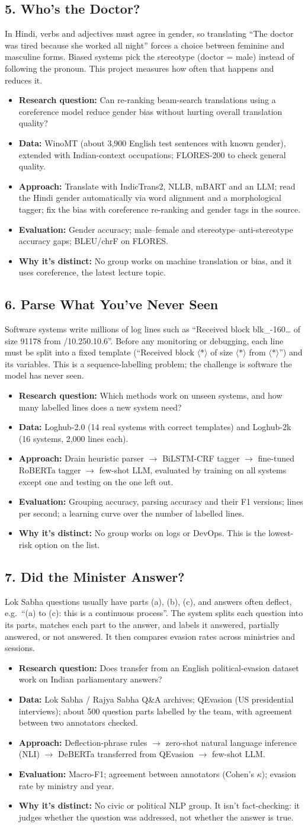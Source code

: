 \documentclass[11pt,a4paper]{article}
\newcommand{\project}[7]{%
  \needspace{14\baselineskip}
  \subsection{#1}
  #2
  \begin{itemize}
    \item \textbf{Research question:} #3
    \item \textbf{Data:} #4
    \item \textbf{Approach:} #5
    \item \textbf{Evaluation:} #6
    \item \textbf{Why it's distinct:} #7
  \end{itemize}}
\begin{document}
\project{5. Who's the Doctor?}
  {In Hindi, verbs and adjectives must agree in gender, so translating ``The doctor was tired because
   she worked all night'' forces a choice between feminine and masculine forms. Biased systems pick
   the stereotype (doctor = male) instead of following the pronoun. This project measures how often
   that happens and reduces it.}
  {Can re-ranking beam-search translations using a coreference model reduce gender bias without
   hurting overall translation quality?}
  {WinoMT (about 3,900 English test sentences with known gender), extended with Indian-context
   occupations; FLORES-200 to check general quality.}
  {Translate with IndicTrans2, NLLB, mBART and an LLM; read the Hindi gender automatically via word
   alignment and a morphological tagger; fix the bias with coreference re-ranking and gender tags
   in the source.}
  {Gender accuracy; male--female and stereotype--anti-stereotype accuracy gaps; BLEU/chrF on FLORES.}
  {No group works on machine translation or bias, and it uses coreference, the latest lecture topic.}

\project{6. Parse What You've Never Seen}
  {Software systems write millions of log lines such as
   ``Received block blk\_-160\ldots{} of size 91178 from /10.250.10.6''. Before any monitoring or
   debugging, each line must be split into a fixed template
   (``Received block $\langle*\rangle$ of size $\langle*\rangle$ from $\langle*\rangle$'') and its
   variables. This is a sequence-labelling problem; the challenge is software the model has never seen.}
  {Which methods work on unseen systems, and how many labelled lines does a new system need?}
  {Loghub-2.0 (14 real systems with correct templates) and Loghub-2k (16 systems, 2,000 lines each).}
  {Drain heuristic parser $\to$ BiLSTM-CRF tagger $\to$ fine-tuned RoBERTa tagger $\to$ few-shot
   LLM, evaluated by training on all systems except one and testing on the one left out.}
  {Grouping accuracy, parsing accuracy and their F1 versions; lines per second; a learning curve
   over the number of labelled lines.}
  {No group works on logs or DevOps. This is the lowest-risk option on the list.}

\project{7. Did the Minister Answer?}
  {Lok Sabha questions usually have parts (a), (b), (c), and answers often deflect, e.g.\
   ``(a) to (c): this is a continuous process''. The system splits each question into its parts,
   matches each part to the answer, and labels it answered, partially answered, or not answered.
   It then compares evasion rates across ministries and sessions.}
  {Does transfer from an English political-evasion dataset work on Indian parliamentary answers?}
  {Lok Sabha / Rajya Sabha Q\&A archives; QEvasion (US presidential interviews); about 500
   question parts labelled by the team, with agreement between two annotators checked.}
  {Deflection-phrase rules $\to$ zero-shot natural language inference (NLI) $\to$ DeBERTa transferred
   from QEvasion $\to$ few-shot LLM.}
  {Macro-F1; agreement between annotators (Cohen's $\kappa$); evasion rate by ministry and year.}
  {No civic or political NLP group. It isn't fact-checking: it judges whether the question was
   addressed, not whether the answer is true.}
\end{document}
